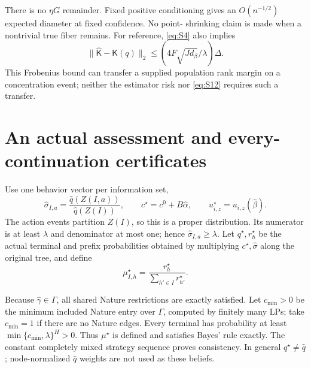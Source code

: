 \documentclass[11pt,a4paper]{article}
\numberwithin{equation}{section}
\theoremstyle{definition}
\begin{document}
There is no \(\eta G\) remainder. Fixed positive conditioning gives
an \(O(n^{-1/2})\) expected diameter at fixed confidence. No point-
shrinking claim is made when a nontrivial true fiber remains.
For reference, \eqref{eq:S4} also implies
\[
 \|\widehat{\mathsf K}-\mathsf K(q)\|_2
          \le (4F\sqrt{Jd_\beta}/\lambda)\Delta .
\]
This Frobenius bound can transfer a supplied population rank margin
on a concentration event; neither the estimator risk nor
\eqref{eq:S12} requires such a transfer.

\section{An actual assessment and every-continuation certificates}
\label{sec:actual}
Use one behavior vector per information set,
\begin{equation}\label{eq:actualconstruction}
 \widehat\sigma_{I,a}
   =\frac{\widehat q(Z(I,a))}{\widehat q(Z(I))},\qquad
 c^\star=c^0+B\widehat\alpha,\qquad
 u^\star_{i,z}=u_{i,z}(\widehat\beta).
\end{equation}
The action events partition \(Z(I)\), so this is a proper distribution.
Its numerator is at least \(\lambda\) and denominator at most one;
hence \(\widehat\sigma_{I,a}\ge\lambda\).
Let \(q^\star,r^\star_h\) be the actual terminal and prefix
probabilities obtained by multiplying \(c^\star,\widehat\sigma\)
along the original tree, and define
\begin{equation}\label{eq:actualbelief}
 \mu^\star_{I,h}
     =\frac{r^\star_h}{\sum_{h'\in I}r^\star_{h'}}.
\end{equation}

Because \(\widehat\gamma\in\Gamma\), all shared Nature restrictions
are exactly satisfied. Let \(c_{\min}>0\) be the minimum included
Nature entry over \(\Gamma\), computed by finitely many LPs;
take \(c_{\min}=1\) if there are no Nature edges.
Every terminal has probability at least
\(\min\{c_{\min},\lambda\}^{H}>0\).
Thus \(\mu^\star\) is defined and satisfies Bayes' rule exactly.
The constant completely mixed strategy sequence proves consistency.
In general \(q^\star\ne\widehat q\); node-normalized
\(\widehat q\) weights are not used as these beliefs.
\end{document}
